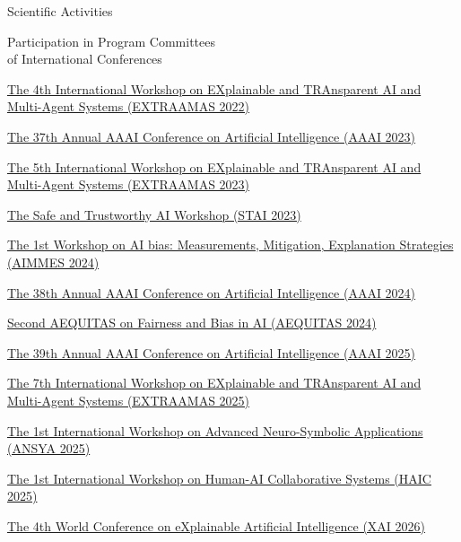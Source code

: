 \documentclass{resume} %
\begin{document}
\begin{rSection}{Scientific Activities}
        \begin{rSubsection2}{Participation in Program Committees\\ of International Conferences}
            \item \href{https://extraamas.ehealth.hevs.ch/archive.html#organizations-2022}{The 4th International Workshop on EXplainable and TRAnsparent AI and Multi-Agent Systems (EXTRAAMAS 2022)}
            \item \href{https://apice.unibo.it/xwiki/bin/view/Event/Aaai2023}{The 37th Annual AAAI Conference on Artificial Intelligence (AAAI 2023)}
            \item \href{https://apice.unibo.it/xwiki/bin/view/Event/Prima2023}{The 5th International Workshop on EXplainable and TRAnsparent AI and Multi-Agent Systems (EXTRAAMAS 2023)}
            \item \href{https://web.archive.org/web/20240225110652/https://www.stai.uk/stai-23-iclp}{The Safe and Trustworthy AI Workshop (STAI 2023)}
            \item \href{https://fairnesscluster.github.io/aimmes23.github.io/index.html}{The 1st Workshop on AI bias: Measurements, Mitigation, Explanation Strategies (AIMMES 2024)}
            \item \href{https://apice.unibo.it/xwiki/bin/view/Event/Aaai2024}{The 38th Annual AAAI Conference on Artificial Intelligence (AAAI 2024)}
            \item \href{https://aequitas-aod.github.io/aequitas-ecai24.github.io/pc-member.html}{Second AEQUITAS on Fairness and Bias in AI (AEQUITAS 2024)}
            \item \href{https://aaai.org/conference/aaai/aaai-25/}{The 39th Annual AAAI Conference on Artificial Intelligence (AAAI 2025)}
            \item \href{https://extraamas.ehealth.hevs.ch/index.html}{The 7th International Workshop on EXplainable and TRAnsparent AI and Multi-Agent Systems (EXTRAAMAS 2025)}
            \item \href{https://ansya-workshop.github.io/2025}{The 1st International Workshop on Advanced Neuro-Symbolic Applications (ANSYA 2025)}
            \item \href{https://haic-workshop.github.io/haic.github.io}{The 1st International Workshop on Human-AI Collaborative Systems (HAIC 2025)}
            \item \href{https://xaiworldconference.com/2026/}{The 4th World Conference on eXplainable Artificial Intelligence (XAI 2026)}

\end{rSubsection2}
\end{rSection}
\end{document}

